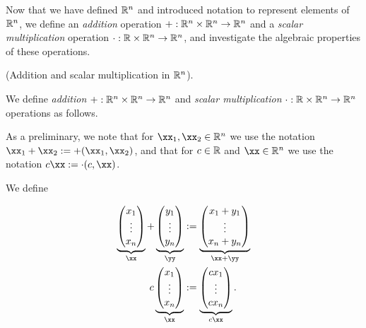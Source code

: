 Now that we have defined $\mathbb{R}^n$ and introduced notation to represent elements of $\mathbb{R}^n$, we define an \textit{addition} operation $+:\mathbb{R}^n \times \mathbb{R}^n \rightarrow \mathbb{R}^n$ and a \textit{scalar multiplication} operation $\cdot: \mathbb{R} \times \mathbb{R}^n \rightarrow \mathbb{R}^n$, and investigate the algebraic properties of these operations.

\begin{defn}
    (Addition and scalar multiplication in $\mathbb{R}^n$).
    
    We define \textit{addition} $+:\mathbb{R}^n \times \mathbb{R}^n \rightarrow \mathbb{R}^n$ and \textit{scalar multiplication} $\cdot:\mathbb{R} \times \mathbb{R}^n \rightarrow \mathbb{R}^n$ operations as follows.
    
    As a preliminary, we note that for $\xx_1, \xx_2 \in \R^n$ we use the notation $\xx_1 + \xx_2 := +(\xx_1, \xx_2)$, and that for $c \in \mathbb{R}$ and $\xx \in \R^n$ we use the notation $c \xx := \cdot(c, \xx)$.
    
    We define
    
    \begin{align*}
        \underbrace
        {
            \begin{pmatrix}
                x_1 \\ \vdots \\ x_n
            \end{pmatrix}
        }_\xx
        +
        \underbrace
        {
            \begin{pmatrix}
                y_1 \\ \vdots \\ y_n
            \end{pmatrix}
        }_\yy
        &:=
        \underbrace
        {
            \begin{pmatrix}
                x_1 + y_1 \\ \vdots \\ x_n + y_n
            \end{pmatrix}
        }_{\xx + \yy}
        \\
        c
        \underbrace
        {
            \begin{pmatrix}
                x_1 \\ \vdots \\ x_n
            \end{pmatrix}
        }_\xx
        &:=
        \underbrace
        {
            \begin{pmatrix}
                c x_1 \\ \vdots \\ c x_n
            \end{pmatrix}
        }_{c \xx}.
    \end{align*}
\end{defn}

